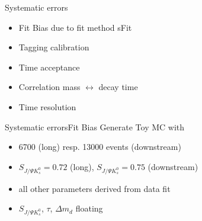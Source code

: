 \documentclass{beamer}
\newcommand{\SJPsi}{S_{J/\Psi K_s^0}}
\begin{document}
	
	\begin{frame}{Systematic errors}
	\begin{itemize}
		\item Fit Bias due to fit method sFit
	    \item Tagging calibration
	    \item Time acceptance
	    \item Correlation mass $\leftrightarrow$ decay time
	    \item Time resolution
	\end{itemize}
	\end{frame}
	
	\begin{frame}{Systematic errors}{Fit Bias}
	Generate Toy MC with 
	\begin{itemize}
	\item 6700 (long) resp. 13000 events (downstream)
	\item $\SJPsi = 0.72$ (long), $\SJPsi = 0.75$ (downstream)
	\item all other parameters derived from data fit
	\item $\SJPsi$, $\tau$, $\Delta m_d$ floating
	\end{itemize}
    \end{frame}	
	
\end{document}
